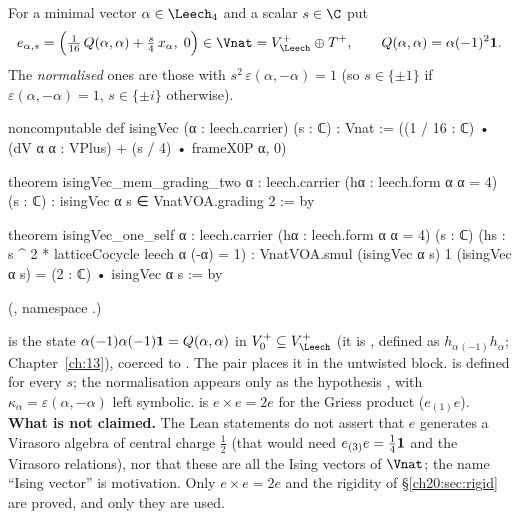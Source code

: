 \begin{definition}\label{ch20:def:ising}
For a minimal vector $\alpha\in\chtwentyLf$ and a scalar $s\in\C$ put
\begin{equation}\label{ch20:eq:ising}
  e_{\alpha,s}=\Bigl(\tfrac1{16}\,Q(\alpha,\alpha)+\tfrac s4\,x_\alpha,\;0\Bigr)\in\Vnat=\chtwentyVL\oplus\chtwentyTp,
  \qquad Q(\alpha,\alpha)=\alpha(-1)^2\chtwentyvac .
\end{equation}
The \emph{normalised} ones are those with $s^2\,\varepsilon(\alpha,-\alpha)=1$ (so $s\in\{\pm1\}$ if
$\varepsilon(\alpha,-\alpha)=1$, $s\in\{\pm i\}$ otherwise).
\end{definition}
\begin{leancode}
noncomputable def isingVec (α : leech.carrier) (s : ℂ) : Vnat :=
  ((1 / 16 : ℂ) • (dV α α : VPlus) + (s / 4) • frameX0P α, 0)

theorem isingVec_mem_grading_two {α : leech.carrier} (hα : leech.form α α = 4)
    (s : ℂ) : isingVec α s ∈ VnatVOA.grading 2 := by

theorem isingVec_one_self {α : leech.carrier} (hα : leech.form α α = 4) (s : ℂ)
    (hs : s ^ 2 * latticeCocycle leech α (-α) = 1) :
    VnatVOA.smul (isingVec α s) 1 (isingVec α s) = (2 : ℂ) • isingVec α s := by
\end{leancode}
(, namespace .)
\begin{dictionary}
 is the state $\alpha(-1)\alpha(-1)\mathbf 1=Q(\alpha,\alpha)$ in $V_0^+\subseteq\chtwentyVL$ (it is
, defined as $h_\alpha{}_{(-1)}h_\alpha$; Chapter~\ref{ch:13}), coerced to .  The pair 
places it in the untwisted block.   is defined for every $s$; the normalisation appears only as the
hypothesis , with $\kappa_\alpha=\varepsilon(\alpha,-\alpha)$ left symbolic.   is $e\times e=2e$
for the Griess product ($e_{(1)}e$).  \textbf{What is not claimed.}  The Lean statements do not assert that $e$ generates a
Virasoro algebra of central charge $\tfrac12$ (that would need $e_{(3)}e=\tfrac14\mathbf 1$ and the Virasoro relations), nor
that these are all the Ising vectors of $\Vnat$; the name ``Ising vector'' is motivation.  Only $e\times e=2e$ and the
rigidity of \S\ref{ch20:sec:rigid} are proved, and only they are used.
\end{dictionary}
